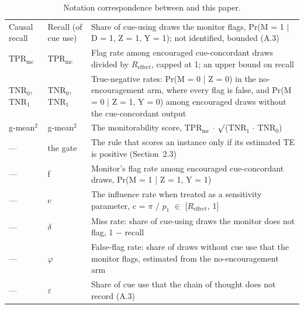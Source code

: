 \documentclass[11pt,a4paper]{article}
\begin{document}
\begin{table}[H]
\begin{tabularx}{\linewidth}{@{}>{\raggedright\arraybackslash}p{2.4cm}>{\raggedright\arraybackslash}p{2.2cm}X@{}}
    Causal recall & Recall (of cue use) & Share of cue-using draws the monitor flags, Pr(M = 1 | D = 1, Z = 1, Y = 1); not identified, bounded (A.3) \\ \addlinespace[3pt]
    $\mathrm{TPR}_{\mathrm{mc}}$ & $\mathrm{TPR}_{\mathrm{mc}}$ & Flag rate among encouraged cue-concordant draws divided by $R_{\mathrm{effect}}$, capped at 1; an upper bound on recall \\ \addlinespace[3pt]
    $\mathrm{TNR}_0$, $\mathrm{TNR}_1$ & $\mathrm{TNR}_0$, $\mathrm{TNR}_1$ & True-negative rates: Pr(M = 0 | Z = 0) in the no-encouragement arm, where every flag is false, and Pr(M = 0 | Z = 1, Y = 0) among encouraged draws without the cue-concordant output \\ \addlinespace[3pt]
    g-mean$^2$ & g-mean$^2$ & The monitorability score, $\mathrm{TPR}_{\mathrm{mc}}$ $\cdot$ $\surd$($\mathrm{TNR}_1$ $\cdot$ $\mathrm{TNR}_0$) \\ \addlinespace[3pt]
    — & the gate & The rule that scores an instance only if its estimated TE is positive (Section~2.3) \\ \addlinespace[3pt]
    — & f & Monitor’s flag rate among encouraged cue-concordant draws, Pr(M = 1 | Z = 1, Y = 1) \\ \addlinespace[3pt]
    — & c & The influence rate when treated as a sensitivity parameter, c = $\pi$ / $p_1$ $\in$ [$R_{\mathrm{effect}}$, 1] \\ \addlinespace[3pt]
    — & $\delta$ & Miss rate: share of cue-using draws the monitor does not flag, 1 $-$ recall \\ \addlinespace[3pt]
    — & $\varphi$ & False-flag rate: share of draws without cue use that the monitor flags, estimated from the no-encouragement arm \\ \addlinespace[3pt]
    — & $\varepsilon$ & Share of cue use that the chain of thought does not record (A.3) \\
    \bottomrule
  \end{tabularx}
  \caption{Notation correspondence between \citet{guan2025monitoring} and this paper.}
\end{table}
\end{document}
